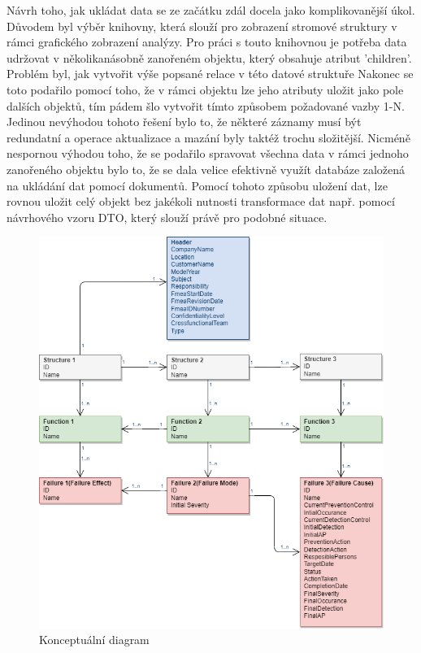 Návrh toho, jak ukládat data se ze začátku zdál docela jako komplikovanější úkol. Důvodem byl výběr knihovny, která slouží pro zobrazení stromové struktury v rámci grafického zobrazení analýzy. Pro práci s touto knihovnou je potřeba data udržovat v několikanásobně zanořeném objektu, který obsahuje atribut 'children'. Problém byl, jak vytvořit výše popsané relace v této datové struktuře Nakonec se toto podařilo pomocí toho, že v rámci objektu lze jeho atributy uložit jako pole dalších objektů, tím pádem šlo vytvořit tímto způsobem požadované vazby 1-N. Jedinou nevýhodou tohoto řešení bylo to, že některé záznamy musí být redundatní a operace aktualizace a mazání byly taktéž trochu složitější. Nicméně nespornou výhodou toho, že se podařilo spravovat všechna data v rámci jednoho zanořeného objektu bylo to, že se dala velice efektivně využít databáze založená na ukládání dat pomocí dokumentů. Pomocí tohoto způsobu uložení dat, lze rovnou uložit celý objekt bez jakékoli nutnosti transformace dat např. pomocí návrhového vzoru DTO, který slouží právě pro podobné situace. 

\begin{figure}[H]
\centering
	\includegraphics[width=1.0\textwidth]{Figures/db_model.png}
	\caption{Konceptuální diagram }
	\label{fig:db}
\end{figure}

